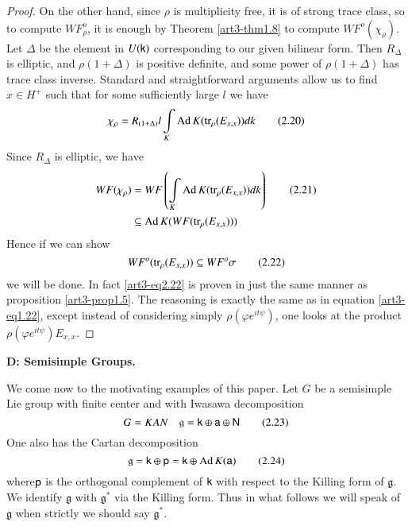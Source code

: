\begin{proof}
On the other hand, since $\rho$ is multiplicity free, it is of strong trace class, so to compute $WF^{o}_{\rho}$, it is enough by Theorem \ref{art3-thm1.8} to compute $WF^{o}(\chi_{\rho})$. Let $\Delta$ be the element in $U(\mathsf{k})$ corresponding to our given bilinear form. Then $R_{\Delta}$ is elliptic, and $\rho(1+\Delta)$ is positive definite, and some power of $\rho(1+\Delta)$ has trace class inverse. Standard and straightforward arguments allow us to find $x\in H^{+}$ such that for some sufficiently large $l$ we have
\begin{equation*}
\chi_{\rho}=R_{(1+\Delta)}l\int\limits_{K}\operatorname{Ad} K(\operatorname{tr}_{\rho}(E_{x,x}))dk\tag{2.20}\label{art3-eq2.20}
\end{equation*}
Since $R_{\Delta}$ is elliptic, we have
\begin{align*}
WF(\chi_{\rho}) &= WF\left(\int\limits_{K}\operatorname{Ad} K(\operatorname{tr}_{\rho}(E_{x,x}))dk\right)\tag{2.21}\label{art3-eq2.21}\\
&\subseteq \operatorname{Ad} K(WF(\operatorname{tr}_{\rho}(E_{x,x})))
\end{align*}
Hence if we can show
\begin{equation*}
WF^{o}(\operatorname{tr}_{\rho}(E_{x,x}))\subseteq WF^{o}\sigma\tag{2.22}\label{art3-eq2.22}
\end{equation*}
we will be done. In fact \eqref{art3-eq2.22} is proven in just the same manner as proposition \ref{art3-prop1.5}. The reasoning is exactly the same as in equation \eqref{art3-eq1.22}, except instead of considering simply $\rho(\varphi e^{it\psi})$, one looks at the product $\rho(\varphi e^{it\psi})E_{x,x}$.
\end{proof}

\medskip
\noindent
{\bf D: Semisimple Groups.}
\smallskip

We come now to the motivating examples of this paper. Let $G$ be a semisimple Lie group with finite center and with Iwasawa decomposition 
\begin{equation*}
G=KAN\quad \mathfrak{g}=\mathsf{k}\oplus \mathsf{a}\oplus \mathsf{N}\tag{2.23}\label{art3-eq2.23}
\end{equation*}
One also has the Cartan decomposition
\begin{equation*}
\mathfrak{g}=\mathsf{k}\oplus \mathsf{p}=\mathsf{k}\oplus \operatorname{Ad} K(\mathsf{a})\tag{2.24}\label{art3-eq2.24}
\end{equation*}
\eject
\noindent
where\pageoriginale $\mathsf{p}$ is the orthogonal complement of $\mathsf{k}$ with respect to the Killing form of $\mathfrak{g}$. We identify $\mathfrak{g}$ with $\mathfrak{g}^{*}$ via the Killing form. Thus in what follows we will speak of $\mathfrak{g}$ when strictly we should say $\mathfrak{g}^{*}$.


